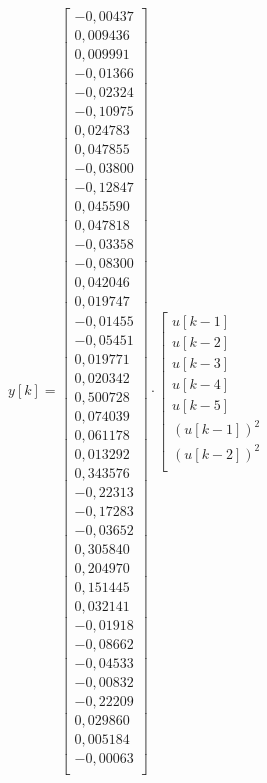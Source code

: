 \documentclass[a4paper,titlepage,11pt,floatssmall]{mwrep}
\begin{document}
$$ 
y[k] = 
\left[\begin{array}{c}
-0,00437\\
0,009436\\
0,009991\\
-0,01366\\
-0,02324\\
-0,10975\\
0,024783\\
0,047855\\
-0,03800\\
-0,12847\\
0,045590\\
0,047818\\
-0,03358\\
-0,08300\\
0,042046\\
0,019747\\
-0,01455\\
-0,05451\\
0,019771\\
0,020342\\
0,500728\\
0,074039\\
0,061178\\
0,013292\\
0,343576\\
-0,22313\\
-0,17283\\
-0,03652\\
0,305840\\
0,204970\\
0,151445\\
0,032141\\
-0,01918\\
-0,08662\\
-0,04533\\
-0,00832\\
-0,22209\\
0,029860\\
0,005184\\
-0,00063\\
\end{array} \right]
\cdot
\left[\begin{array}{c}
   u[k-1] \\
   u[k-2] \\
   u[k-3] \\ 
   u[k-4] \\ 
   u[k-5] \\ 
   (u[k-1])^2 \\
   (u[k-2])^2 \\

\end{array}$$
\end{document}
